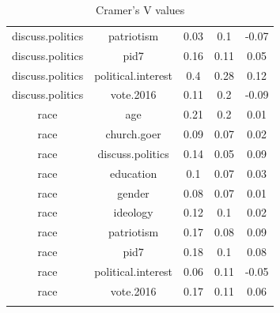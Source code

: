 \documentclass[11pt]{article}
\begin{document}
\begin{table}[!htbp]
\begin{tabular}{@{\extracolsep{5pt}} ccccc}
discuss.politics & patriotism & 0.03 & 0.1 & -0.07 \\
discuss.politics & pid7 & 0.16 & 0.11 & 0.05 \\
discuss.politics & political.interest & 0.4 & 0.28 & 0.12 \\
discuss.politics & vote.2016 & 0.11 & 0.2 & -0.09 \\
race & age & 0.21 & 0.2 & 0.01 \\
race & church.goer & 0.09 & 0.07 & 0.02 \\
race & discuss.politics & 0.14 & 0.05 & 0.09 \\
race & education & 0.1 & 0.07 & 0.03 \\
race & gender & 0.08 & 0.07 & 0.01 \\
race & ideology & 0.12 & 0.1 & 0.02 \\
race & patriotism & 0.17 & 0.08 & 0.09 \\
race & pid7 & 0.18 & 0.1 & 0.08 \\
race & political.interest & 0.06 & 0.11 & -0.05 \\
race & vote.2016 & 0.17 & 0.11 & 0.06 \\
\bottomrule{}
\end{tabular}
  \caption{Cramer's V values}
  \label{tab:cramersvnumbers1}
\end{table}
\end{document}
